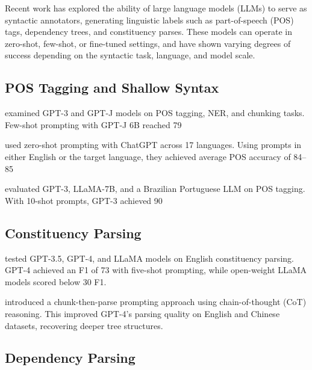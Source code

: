Recent work has explored the ability of large language models (LLMs) to serve as syntactic annotators, generating linguistic labels such as part-of-speech (POS) tags, dependency trees, and constituency parses. These models can operate in zero-shot, few-shot, or fine-tuned settings, and have shown varying degrees of success depending on the syntactic task, language, and model scale.

\subsection{POS Tagging and Shallow Syntax}

\citet{blevins2023llmpos} examined GPT-3 and GPT-J models on POS tagging, NER, and chunking tasks. Few-shot prompting with GPT-J 6B reached 79%

\citet{lai2023chatgptpos} used zero-shot prompting with ChatGPT across 17 languages. Using prompts in either English or the target language, they achieved average POS accuracy of 84--85%

\citet{machado2024portpos} evaluated GPT-3, LLaMA-7B, and a Brazilian Portuguese LLM on POS tagging. With 10-shot prompts, GPT-3 achieved 90%

\subsection{Constituency Parsing}

\citet{bai2023llmconst} tested GPT-3.5, GPT-4, and LLaMA models on English constituency parsing. GPT-4 achieved an F1 of 73 with five-shot prompting, while open-weight LLaMA models scored below 30 F1.

\citet{tian2024chunkprompt} introduced a chunk-then-parse prompting approach using chain-of-thought (CoT) reasoning. This improved GPT-4's parsing quality on English and Chinese datasets, recovering deeper tree structures.

\subsection{Dependency Parsing}

